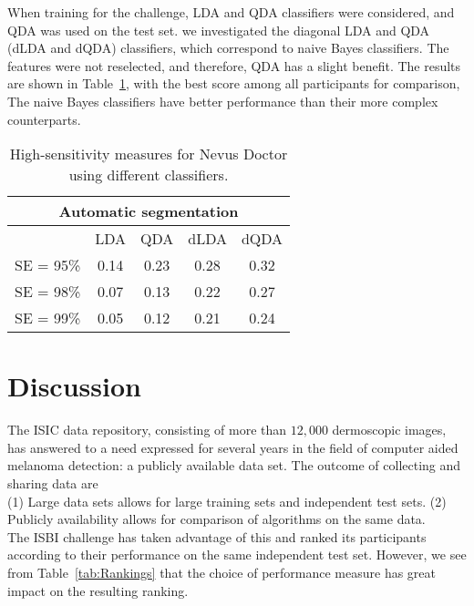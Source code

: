 \documentclass[a4paper,12pt]{article}
\begin{document}
When training for the challenge, LDA and QDA classifiers were considered, and QDA was used on the test set. %
we investigated the diagonal LDA and QDA (dLDA and dQDA) classifiers, which correspond to naive Bayes classifiers. The features were not reselected, and therefore, QDA has a slight benefit. The results are shown in Table~\ref{tab:Diagonal}, with the best score among all participants for comparison,  
The naive Bayes classifiers have better performance than their more complex counterparts. 
\begin{table}
\begin{tabular}{c | c | c | c | c}
        \multicolumn{5}{c}{Automatic segmentation} \\
        \hline
        & LDA & QDA & dLDA & dQDA \\
        \hline
   SE = 95\% & 0.14 & 0.23 & 0.28 &0.32\\
  SE = 98\% & 0.07 & 0.13 & 0.22 & 0.27 \\
  SE = 99\% & 0.05 & 0.12 & 0.21 & 0.24 
\end{tabular}
  \caption{High-sensitivity measures for Nevus Doctor using different classifiers.}
  \label{tab:Diagonal}
\end{table}


 
\section{Discussion} \label{sec:Discussion} %

The ISIC data repository, consisting of more than $12,000$ dermoscopic images, has answered to a need expressed for several years in the field of computer aided melanoma detection: a publicly available data set. 
The outcome of collecting and sharing data are \\
(1) Large data sets allows for large training sets and independent test sets. (2) Publicly availability allows for comparison of algorithms on the same data. \\
The ISBI challenge has taken advantage of this and ranked its participants according to their performance on the same independent test set. However, we see from Table~\ref{tab:Rankings} that the choice of performance measure has great impact on the resulting ranking. 
\end{document}
